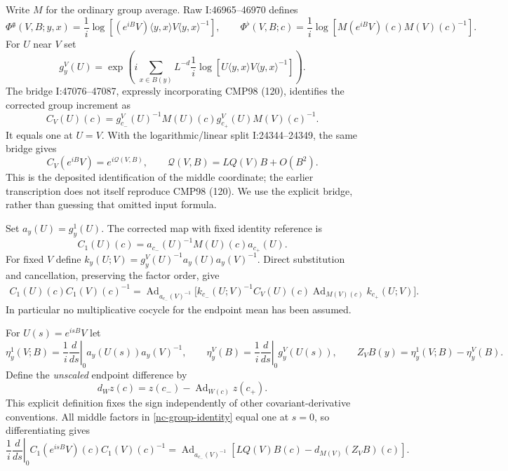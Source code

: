 \documentclass[11pt]{article}
\theoremstyle{remark}
\begin{document}
Write $M$ for the ordinary group average. Raw I:46965--46970
defines
\[
 \Phi^{\mathfrak g}(V,B;y,x)=\frac1i\log[
   (e^{iB}V)\langle y,x\rangle V\langle y,x\rangle^{-1}],
 \qquad
 \Phi^{\flat}(V,B;c)=\frac1i\log[M(e^{iB}V)(c)M(V)(c)^{-1}].
\]
For $U$ near $V$ set
\begin{equation}
 g_y^V(U)=\exp\left(i\sum_{x\in B(y)}L^{-d}
       \frac1i\log[U\langle y,x\rangle V\langle y,x\rangle^{-1}]
                   \right).
 \label{nc-endpoint-mean}
\end{equation}
The bridge I:47076--47087, expressly incorporating CMP98 (120),
identifies the corrected group increment as
\begin{equation}
 C_V(U)(c)=g_{c_-}^V(U)^{-1}M(U)(c)g_{c_+}^V(U)M(V)(c)^{-1}.
 \label{nc-moving-corrected}
\end{equation}
It equals one at $U=V$. With the logarithmic/linear split
I:24344--24349, the same bridge gives
\begin{equation}
 C_V(e^{iB}V)=e^{i\mathcal Q(V,B)},\qquad
 \mathcal Q(V,B)=LQ(V)B+O(B^2).
 \label{nc-source-linearization}
\end{equation}
This is the deposited identification of the middle coordinate;
the earlier transcription does not itself reproduce CMP98 (120).
We use the explicit bridge, rather than guessing that omitted input
formula.

Set $a_y(U)=g_y^1(U)$. The corrected map with fixed identity
reference is
\begin{equation}
 C_1(U)(c)=a_{c_-}(U)^{-1}M(U)(c)a_{c_+}(U).
 \label{nc-fixed-corrected}
\end{equation}
For fixed $V$ define
$k_y(U;V)=g_y^V(U)^{-1}a_y(U)a_y(V)^{-1}$. Direct substitution
and cancellation, preserving the factor order, give
\begin{equation}
 \begin{split}
 C_1(U)(c)C_1(V)(c)^{-1}
 =\operatorname{Ad}_{a_{c_-}(V)^{-1}}\bigl[
 k_{c_-}(U;V)^{-1}C_V(U)(c)
       \operatorname{Ad}_{M(V)(c)}k_{c_+}(U;V)\bigr].
 \end{split}
 \label{nc-group-identity}
\end{equation}
In particular no multiplicative cocycle for the endpoint mean has
been assumed.

For $U(s)=e^{isB}V$ let
\[
 \eta_y^1(V;B)=\frac1i\left.\frac d{ds}\right|_0
       a_y(U(s))a_y(V)^{-1},\qquad
 \eta_y^V(B)=\frac1i\left.\frac d{ds}\right|_0g_y^V(U(s)),
 \qquad Z_VB(y)=\eta_y^1(V;B)-\eta_y^V(B).
\]
Define the \emph{unscaled} endpoint difference by
\begin{equation}
 d_Wz(c)=z(c_-)-\operatorname{Ad}_{W(c)}z(c_+).
 \label{nc-endpoint-difference}
\end{equation}
This explicit definition fixes the sign independently of other
covariant-derivative conventions. All middle factors in
\eqref{nc-group-identity} equal one at $s=0$, so differentiating
gives
\begin{equation}
 \frac1i\left.\frac d{ds}\right|_0
 C_1(e^{isB}V)(c)C_1(V)(c)^{-1}
 =\operatorname{Ad}_{a_{c_-}(V)^{-1}}
       [LQ(V)B(c)-d_{M(V)}(Z_VB)(c)].
 \label{nc-angular-derivative}
\end{equation}
\end{document}

